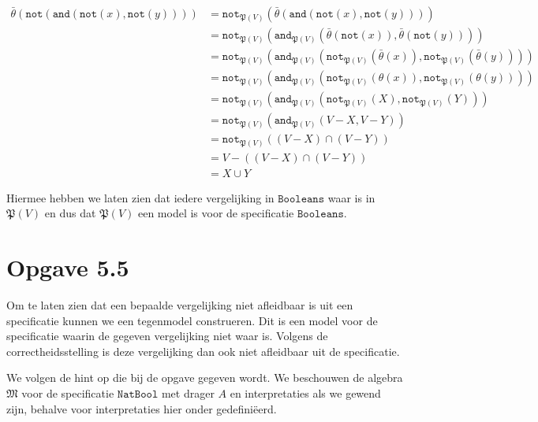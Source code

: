 \documentclass[a4paper,11pt]{article}
\begin{document}
\begin{itemize}
\begin{align*}
\bar \theta(\texttt{not}(\texttt{and}(\texttt{not}(x), \texttt{not}(y))))
      &= \texttt{not}_{\mathfrak{P}(V)}(\bar \theta(\texttt{and}(\texttt{not}(x), \texttt{not}(y)))) \\
      &= \texttt{not}_{\mathfrak{P}(V)}(\texttt{and}_{\mathfrak{P}(V)}(\bar \theta(\texttt{not}(x)), \bar \theta(\texttt{not}(y)))) \\
      &= \texttt{not}_{\mathfrak{P}(V)}(\texttt{and}_{\mathfrak{P}(V)}(\texttt{not}_{\mathfrak{P}(V)}(\bar \theta(x)), \texttt{not}_{\mathfrak{P}(V)}(\bar \theta(y)))) \\
      &= \texttt{not}_{\mathfrak{P}(V)}(\texttt{and}_{\mathfrak{P}(V)}(\texttt{not}_{\mathfrak{P}(V)}(\theta(x)), \texttt{not}_{\mathfrak{P}(V)}(\theta(y)))) \\
      &= \texttt{not}_{\mathfrak{P}(V)}(\texttt{and}_{\mathfrak{P}(V)}(\texttt{not}_{\mathfrak{P}(V)}(X), \texttt{not}_{\mathfrak{P}(V)}(Y))) \\
      &= \texttt{not}_{\mathfrak{P}(V)}(\texttt{and}_{\mathfrak{P}(V)}(V - X, V - Y)) \\
      &= \texttt{not}_{\mathfrak{P}(V)}((V - X) \cap (V - Y)) \\
      &= V - ((V - X) \cap (V - Y)) \\
      &= X \cup Y
\end{align*}

\end{itemize}

Hiermee hebben we laten zien dat iedere vergelijking in $\texttt{Booleans}$
waar is in $\mathfrak{P}(V)$ en dus dat $\mathfrak{P}(V)$ een model is voor de
specificatie $\texttt{Booleans}$.


\section*{Opgave 5.5}

Om te laten zien dat een bepaalde vergelijking niet afleidbaar is uit een
specificatie kunnen we een tegenmodel construeren. Dit is een model voor de
specificatie waarin de gegeven vergelijking niet waar is. Volgens de
correctheidsstelling is deze vergelijking dan ook niet afleidbaar uit de
specificatie.

We volgen de hint op die bij de opgave gegeven wordt. We beschouwen de algebra
$\mathfrak{M}$ voor de specificatie $\texttt{NatBool}$ met drager $A$ en
interpretaties als we gewend zijn, behalve voor interpretaties hier onder
gedefini\"eerd.
\end{document}
